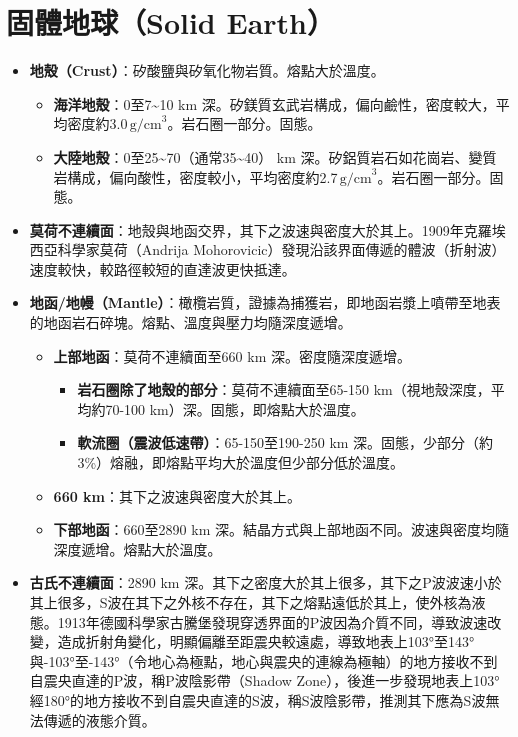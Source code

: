\documentclass[a4paper,12pt]{report}
\begin{document}
\section{固體地球（Solid Earth）}
\begin{itemize}
\item \textbf{地殼（Crust）}：矽酸鹽與矽氧化物岩質。熔點大於溫度。
\begin{itemize}
\item \textbf{海洋地殼}：0至7\sim 10 km 深。矽鎂質玄武岩構成，偏向鹼性，密度較大，平均密度約3.0\,$\text{g/cm}^3$。岩石圈一部分。固態。
\item \textbf{大陸地殼}：0至25\sim 70（通常35\sim 40） km 深。矽鋁質岩石如花崗岩、變質岩構成，偏向酸性，密度較小，平均密度約2.7\,$\text{g/cm}^3$。岩石圈一部分。固態。
\end{itemize}
\item \textbf{莫荷不連續面}：地殼與地函交界，其下之波速與密度大於其上。1909年克羅埃西亞科學家莫荷（Andrija Mohorovicic）發現沿該界面傳遞的體波（折射波）速度較快，較路徑較短的直達波更快抵達。
\item \textbf{地函/地幔（Mantle）}：橄欖岩質，證據為捕獲岩，即地函岩漿上噴帶至地表的地函岩石碎塊。熔點、溫度與壓力均隨深度遞增。
\begin{itemize}
\item \textbf{上部地函}：莫荷不連續面至660 km 深。密度隨深度遞增。
\begin{itemize}
\item \textbf{岩石圈除了地殼的部分}：莫荷不連續面至65-150 km（視地殼深度，平均約70-100 km）深。固態，即熔點大於溫度。
\item \textbf{軟流圈（震波低速帶）}：65-150至190-250 km 深。固態，少部分（約3\%）熔融，即熔點平均大於溫度但少部分低於溫度。
\end{itemize}
\item \textbf{660 km}：其下之波速與密度大於其上。
\item \textbf{下部地函}：660至2890 km 深。結晶方式與上部地函不同。波速與密度均隨深度遞增。熔點大於溫度。
\end{itemize}
\item \textbf{古氏不連續面}：2890 km 深。其下之密度大於其上很多，其下之P波波速小於其上很多，S波在其下之外核不存在，其下之熔點遠低於其上，使外核為液態。1913年德國科學家古騰堡發現穿透界面的P波因為介質不同，導致波速改變，造成折射角變化，明顯偏離至距震央較遠處，導致地表上103°至143°與-103°至-143°（令地心為極點，地心與震央的連線為極軸）的地方接收不到自震央直達的P波，稱P波陰影帶（Shadow Zone），後進一步發現地表上103°經180°的地方接收不到自震央直達的S波，稱S波陰影帶，推測其下應為S波無法傳遞的液態介質。

\end{itemize}
\end{document}
